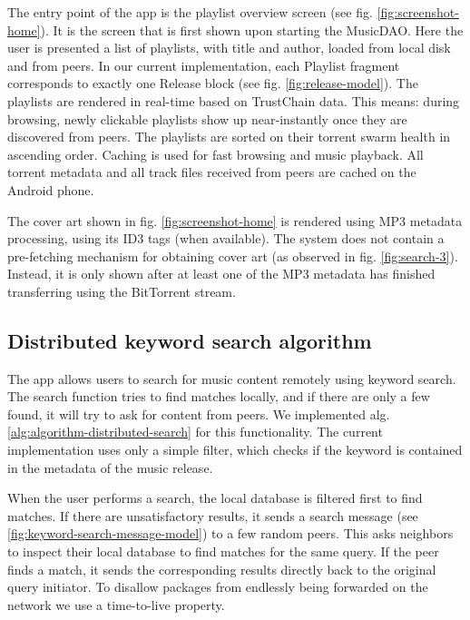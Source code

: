 The entry point of the app is the playlist overview screen (see fig. \ref{fig:screenshot-home}). It is the screen that is first shown upon starting the MusicDAO. Here the user is presented a list of playlists, with title and author, loaded from local disk and from peers. In our current implementation, each Playlist fragment corresponds to exactly one Release block (see fig. \ref{fig:release-model}). The playlists are rendered in real-time based on TrustChain data. This means: during browsing, newly clickable playlists show up near-instantly once they are discovered from peers. The playlists are sorted on their torrent swarm health in ascending order. Caching is used for fast browsing and music playback. All torrent metadata and all track files received from peers are cached on the Android phone.

The cover art shown in fig. \ref{fig:screenshot-home} is rendered using MP3 metadata processing, using its ID3 tags (when available). The system does not contain a pre-fetching mechanism for obtaining cover art (as observed in fig. \ref{fig:search-3}). Instead, it is only shown after at least one of the MP3 metadata has finished transferring using the BitTorrent stream.

\subsection{Distributed keyword search algorithm}
\label{sec:searching-musiccommunity-impl}
The app allows users to search for music content remotely using keyword search. The search function tries to find matches locally, and if there are only a few found, it will try to ask for content from peers. We implemented alg. \ref{alg:algorithm-distributed-search} for this functionality. The current implementation uses only a simple filter, which checks if the keyword is contained in the metadata of the music release.

When the user performs a search, the local database is filtered first to find matches. If there are unsatisfactory results, it sends a search message (see \ref{fig:keyword-search-message-model}) to a few random peers. This asks neighbors to inspect their local database to find matches for the same query. If the peer finds a match, it sends the corresponding results directly back to the original query initiator. To disallow packages from endlessly being forwarded on the network we use a time-to-live property. 

